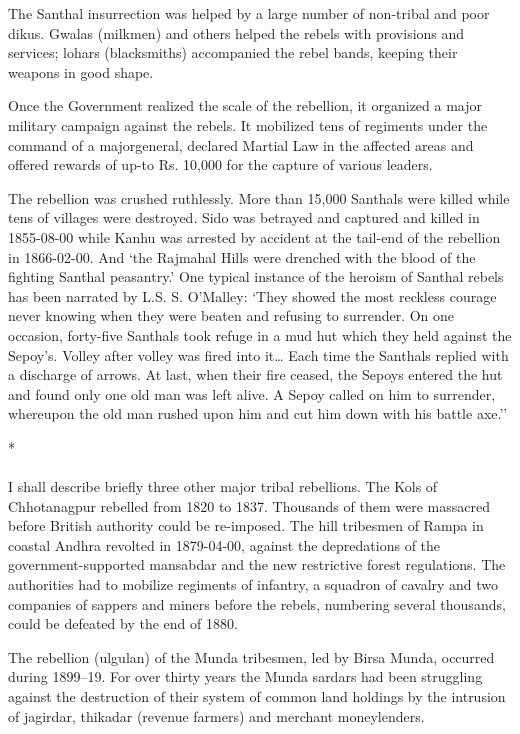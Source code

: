 The Santhal insurrection was helped by a large number of non-tribal and poor dikus. Gwalas (milkmen) and others helped the rebels with provisions and services; lohars (blacksmiths) accompanied the rebel bands, keeping their weapons in good shape.

Once the Government realized the scale of the rebellion, it organized a major military campaign against the rebels. It mobilized tens of regiments under the command of a major­general, declared Martial Law in the affected areas and offered rewards of up-to Rs. 10,000 for the capture of various leaders.

The rebellion was crushed ruthlessly. More than 15,000 Santhals were killed while tens of villages were destroyed. Sido was betrayed and captured and killed in 1855-08-00 while Kanhu was arrested by accident at the tail-end of the rebellion in 1866-02-00. And `the Rajmahal Hills were drenched with the blood of the fighting Santhal peasantry.' One typical instance of the heroism of Santhal rebels has been narrated by L.S. S. O'Malley: `They showed the most reckless courage never knowing when they were beaten and refusing to surrender. On one occasion, forty-five Santhals took refuge in a mud hut which they held against the Sepoy's. Volley after volley was fired into it… Each time the Santhals replied with a discharge of arrows. At last, when their fire ceased, the Sepoys entered the hut and found only one old man was left alive. A Sepoy called on him to surrender, whereupon the old man rushed upon him and cut him down with his battle axe.''

\begin{center}*\end{center}

\paragraph*{}
I shall describe briefly three other major tribal rebellions. The Kols of Chhotanagpur rebelled from 1820 to 1837. Thousands of them were massacred before British authority could be re-imposed. The hill tribesmen of Rampa in coastal Andhra revolted in 1879-04-00, against the depredations of the government-supported mansabdar and the new restrictive forest regulations. The authorities had to mobilize regiments of infantry, a squadron of cavalry and two companies of sappers and miners before the rebels, numbering several thousands, could be defeated by the end of 1880.

The rebellion (ulgulan) of the Munda tribesmen, led by Birsa Munda, occurred during 1899--19. For over thirty years the Munda sardars had been struggling against the destruction of their system of common land holdings by the intrusion of jagirdar, thikadar (revenue farmers) and merchant moneylenders.

